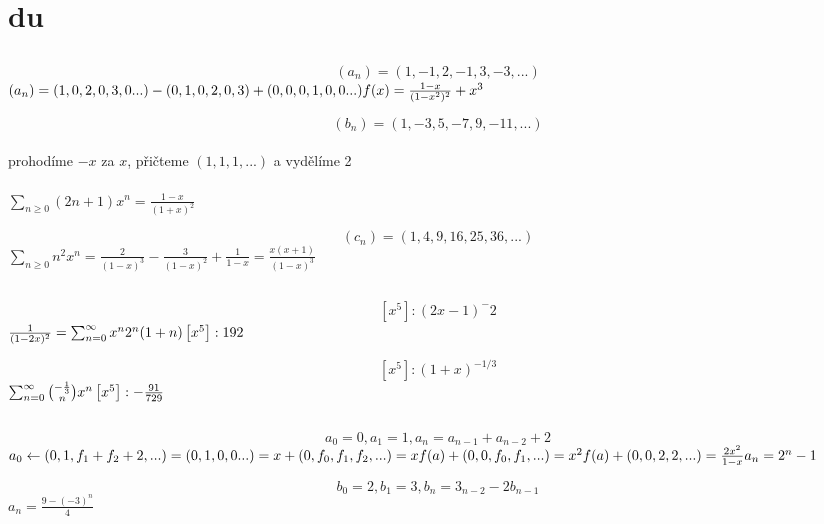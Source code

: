 \documentclass[a4paper]{article}
\begin{document}
\pagestyle{fancy}

\section{du}
\subsection{}
$$
(a_n) = (1, -1, 2, -1, 3, -3, ...)
$$
$
(a_n) = (1, 0, 2, 0, 3, 0 ...) - (0, 1, 0, 2, 0, 3) + (0, 0, 0, 1, 0, 0 ...)\\
f(x) = 	\frac{1-x}{(1-x^2)^2} + x^3	
$

$$
(b_n) = (1, -3, 5, -7, 9, -11, ...)
$$
\\
prohodíme $-x$ za $x$, přičteme $(1, 1, 1, ...)$ a vydělíme 2
\\ \\
$
\sum_{n \geq 0}(2n + 1)x^n = 
\frac{1-x}{(1+x)^2}
$


$$
(c_n) = (1, 4, 9, 16, 25, 36, ...)
$$
$
\sum_{n \geq 0} n^2 x^n =
\frac{2}{(1-x)^3} - \frac{3}{(1-x)^2} + \frac{1}{1-x} = 
\frac{x(x+1)}{(1-x)^3}
$

\subsection{}
$$
[x^5] : (2x - 1)^-2
$$
$
\frac{1}{(1-2x)^2}=
\sum_{n=0}^\infty x^n 2^n (1+n)
\\ \\
\left[ x^5 \right] : 192
$

$$
[x^5] : (1 + x)^{-1/3}
$$
$
\sum_{n=0}^\infty \binom{-\frac{1}{3}}{n} x^n
\\ \\
\left[ x^5 \right] : -\frac{91}{729}
$


\subsection{}
$$
a_0 = 0, a_1 = 1, a_n = a_{n-1} + a_{n-2} + 2
$$
$
a_0 \leftarrow (0, 1, f_1 + f_2 + 2, ...)\\
=(0, 1, 0, 0 ...) = x \\
+(0, f_0, f_1, f_2, ...) = x f(a)\\
+(0, 0, f_0, f_1, ...) = x^2 f(a)\\ 
+(0, 0, 2,2, ...) = \frac{2x^2}{1-x}
\\ \\
a_n = 2^n -1
$

$$
b_0 = 2, b_1 = 3, b_n = 3_{n-2} - 2b_{n-1}
$$
$
a_n = \frac{9-(-3)^n}{4}
$
\end{document}

